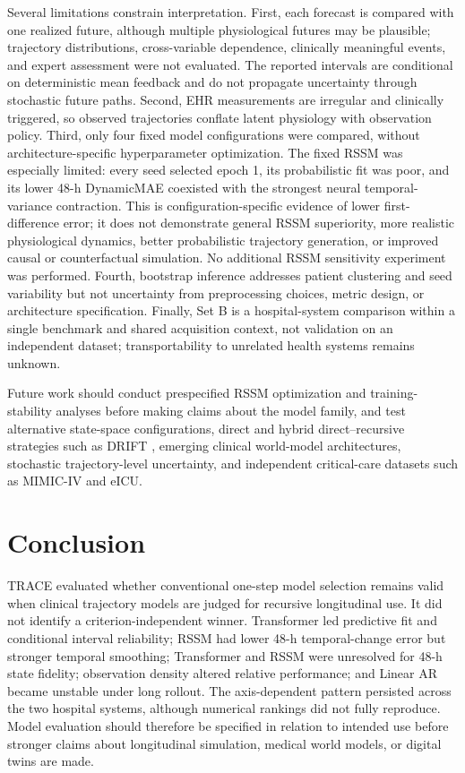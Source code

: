 \documentclass[preprint,12pt]{elsarticle}
\begin{document}
Several limitations constrain interpretation. First, each forecast is
compared with one realized future, although multiple physiological
futures may be plausible; trajectory distributions, cross-variable
dependence, clinically meaningful events, and expert assessment were
not evaluated. The reported intervals are conditional on deterministic
mean feedback and do not propagate uncertainty through stochastic
future paths. Second, EHR measurements are irregular and clinically
triggered, so observed trajectories conflate latent physiology with
observation policy. Third, only four fixed model configurations were
compared, without architecture-specific hyperparameter optimization.
The fixed RSSM was especially limited: every seed selected epoch 1, its
probabilistic fit was poor, and its lower 48-h DynamicMAE coexisted with
the strongest neural temporal-variance contraction. This is
configuration-specific evidence of lower first-difference error; it
does not demonstrate general RSSM superiority, more realistic
physiological dynamics, better probabilistic trajectory generation, or
improved causal or counterfactual simulation. No additional RSSM
sensitivity experiment was performed. Fourth, bootstrap inference
addresses patient clustering and seed variability but not uncertainty
from preprocessing choices, metric design, or architecture
specification. Finally, Set B is a hospital-system comparison within a
single benchmark and shared acquisition context, not validation on an
independent dataset; transportability to unrelated health systems
remains unknown.

Future work should conduct prespecified RSSM optimization and
training-stability analyses before making claims about the model family,
and test alternative state-space configurations, direct and hybrid
direct--recursive strategies such as DRIFT \cite{liu2026drift}, emerging
clinical world-model architectures, stochastic trajectory-level
uncertainty, and independent critical-care datasets such as MIMIC-IV
and eICU.

\section{Conclusion}

TRACE evaluated whether conventional one-step model selection remains valid when clinical trajectory models are judged for recursive longitudinal use. It did not identify a criterion-independent winner. Transformer led predictive fit and conditional interval reliability; RSSM had lower 48-h temporal-change error but stronger temporal smoothing; Transformer and RSSM were unresolved for 48-h state fidelity; observation density altered relative performance; and Linear AR became unstable under long rollout. The axis-dependent pattern persisted across the two hospital systems, although numerical rankings did not fully reproduce. Model evaluation should therefore be specified in relation to intended use before stronger claims about longitudinal simulation, medical world models, or digital twins are made.
\end{document}

